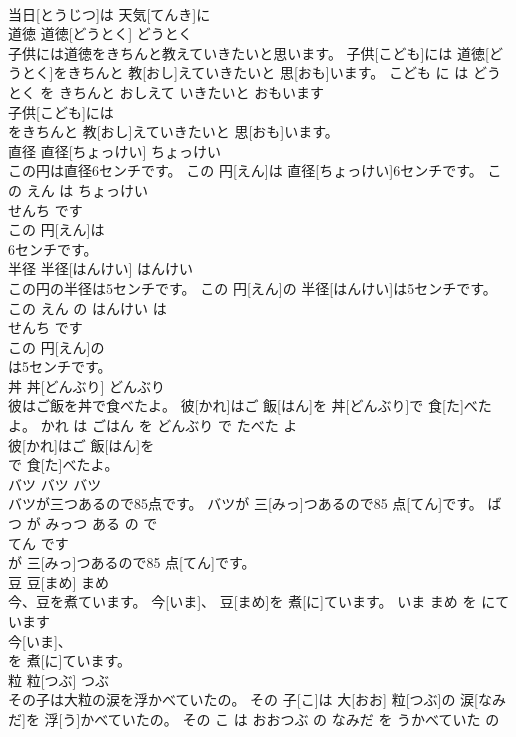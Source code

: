 \documentclass[8pt]{extreport}
\begin{document}
\begin{CJK}{UTF8}{min}
\\	当日[とうじつ]は 天気[てんき]に
\\	道徳	道徳[どうとく]	どうとく	
\\	子供には道徳をきちんと教えていきたいと思います。	子供[こども]には 道徳[どうとく]をきちんと 教[おし]えていきたいと 思[おも]います。	こども に は どうとく を きちんと おしえて いきたいと おもいます	
\\	子供[こども]には
\\	をきちんと 教[おし]えていきたいと 思[おも]います。			
\\	直径	直径[ちょっけい]	ちょっけい	
\\	この円は直径6センチです。	この 円[えん]は 直径[ちょっけい]6センチです。	この えん は ちょっけい 
\\	せんち です	
\\	この 円[えん]は
\\	6センチです。			
\\	半径	半径[はんけい]	はんけい	
\\	この円の半径は5センチです。	この 円[えん]の 半径[はんけい]は5センチです。	この えん の はんけい は 
\\	せんち です	
\\	この 円[えん]の
\\	は5センチです。			
\\	丼	丼[どんぶり]	どんぶり	
\\	彼はご飯を丼で食べたよ。	彼[かれ]はご 飯[はん]を 丼[どんぶり]で 食[た]べたよ。	かれ は ごはん を どんぶり で たべた よ	
\\	彼[かれ]はご 飯[はん]を
\\	で 食[た]べたよ。			
\\	バツ	バツ	バツ	
\\	バツが三つあるので85点です。	バツが 三[みっ]つあるので85 点[てん]です。	ばつ が みっつ ある の で 
\\	てん です	
\\	が 三[みっ]つあるので85 点[てん]です。			
\\	豆	豆[まめ]	まめ	
\\	今、豆を煮ています。	今[いま]、 豆[まめ]を 煮[に]ています。	いま まめ を にて います	
\\	今[いま]、
\\	を 煮[に]ています。			
\\	粒	粒[つぶ]	つぶ	
\\	その子は大粒の涙を浮かべていたの。	その 子[こ]は 大[おお] 粒[つぶ]の 涙[なみだ]を 浮[う]かべていたの。	その こ は おおつぶ の なみだ を うかべていた の	

\end{CJK}
\end{document}

